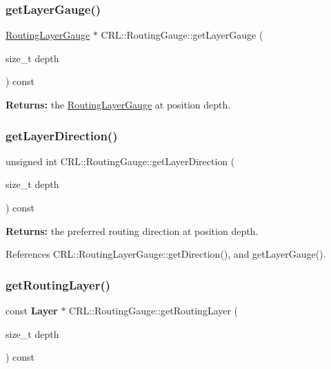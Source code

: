 \subsubsection{\texorpdfstring{get\+Layer\+Gauge()}{getLayerGauge()}\hspace{0.1cm}{\footnotesize\ttfamily [2/2]}}
{\footnotesize\ttfamily \mbox{\hyperlink{classCRL_1_1RoutingLayerGauge}{Routing\+Layer\+Gauge}} $\ast$ C\+R\+L\+::\+Routing\+Gauge\+::get\+Layer\+Gauge (\begin{DoxyParamCaption}\item[{size\+\_\+t}]{depth }\end{DoxyParamCaption}) const}

{\bfseries Returns\+:} the \mbox{\hyperlink{classCRL_1_1RoutingLayerGauge}{Routing\+Layer\+Gauge}} at position {\ttfamily depth}. \mbox{\label{classCRL_1_1RoutingGauge_ab237249b41f605947765118cd1c59635}} 
\subsubsection{\texorpdfstring{get\+Layer\+Direction()}{getLayerDirection()}\hspace{0.1cm}{\footnotesize\ttfamily [2/2]}}
{\footnotesize\ttfamily unsigned int C\+R\+L\+::\+Routing\+Gauge\+::get\+Layer\+Direction (\begin{DoxyParamCaption}\item[{size\+\_\+t}]{depth }\end{DoxyParamCaption}) const\hspace{0.3cm}{\ttfamily [inline]}}

{\bfseries Returns\+:} the preferred routing direction at position {\ttfamily depth}. 

References C\+R\+L\+::\+Routing\+Layer\+Gauge\+::get\+Direction(), and get\+Layer\+Gauge().

\mbox{\label{classCRL_1_1RoutingGauge_a6d6c1951c8728886d3fb702891685b94}} 
\subsubsection{\texorpdfstring{get\+Routing\+Layer()}{getRoutingLayer()}}
{\footnotesize\ttfamily const \textbf{ Layer} $\ast$ C\+R\+L\+::\+Routing\+Gauge\+::get\+Routing\+Layer (\begin{DoxyParamCaption}\item[{size\+\_\+t}]{depth }\end{DoxyParamCaption}) const}

